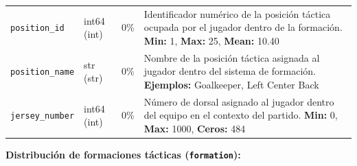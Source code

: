 \documentclass[12pt,a4paper]{article}
\begin{document}
\begin{center}
\begin{longtable}{T{3.5cm} C{2.5cm} C{1.5cm} p{7.0cm}}
\texttt{position\_id} & int64 \newline (int) & 0\% & Identificador numérico de la posición táctica ocupada por el jugador dentro de la formación. \newline \textbf{Min:} 1, \textbf{Max:} 25, \textbf{Mean:} 10.40 \\

\texttt{position\_name} & str \newline (str) & 0\% & Nombre de la posición táctica asignada al jugador dentro del sistema de formación. \newline \textbf{Ejemplos:} Goalkeeper, Left Center Back \\

\texttt{jersey\_number} & int64 \newline (int) & 0\% & Número de dorsal asignado al jugador dentro del equipo en el contexto del partido. \newline \textbf{Min:} 0, \textbf{Max:} 1000, \textbf{Ceros:} 484 \\

\bottomrule
\end{longtable}
\end{center}

\textbf{Distribución de formaciones tácticas (\texttt{formation}):}
\end{document}
